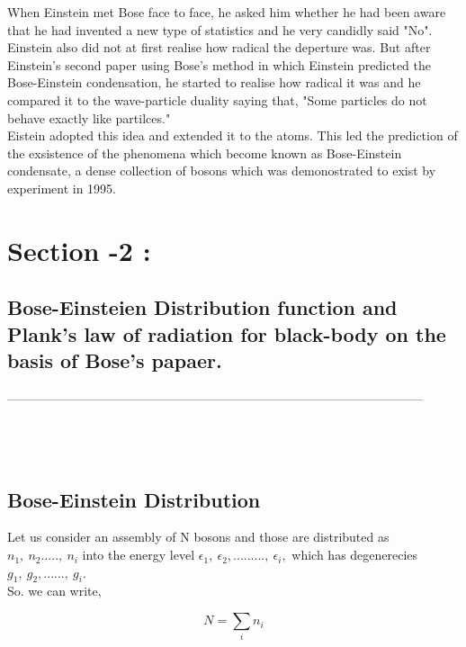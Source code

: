 \documentclass[12pt, letterpaper]{article}
\begin{document}
    When Einstein met Bose face to face, he asked him whether he had been aware that he had invented a new type of statistics and
    he very candidly said "No". Einstein also did not at first realise how radical the deperture was. But after  Einstein's second paper
    using Bose's method in which Einstein predicted the Bose-Einstein condensation, he started to realise how radical it was and he
    compared it to the wave-particle duality saying that, "Some particles do not behave exactly like partilces." \\ 

    Eistein adopted this idea and extended it to the atoms. This led the prediction of the exsistence of the phenomena which become known
    as Bose-Einstein condensate, a dense collection of bosons which was demonostrated to exist by experiment in 1995. \\ 

    \newpage

    \section*{Section -2 :}
    \subsection*{Bose-Einsteien Distribution function and Plank's law of radiation for black-body on the basis of Bose's papaer.}
    \noindent
    --------------------------------------------------------------------------------------------------- \\ 
    \\
    \\
    \\

    \subsection*{Bose-Einstein Distribution}
    Let us consider an assembly of N bosons and those are distributed as $n_{1}, \  n_{2} ....., \  n_{i} $ into the energy level
    $\epsilon_{1}, \  \epsilon_{2}, ........., \ \epsilon_{i}, $ which has degenerecies $g_{1}, \ g_{2},
    ......, \  g_{i}$. \\ 
    
    So. we can write, 

    \begin{equation}
        N = \sum _{i} n_{i}
    \end{equation}
     
\end{document}
